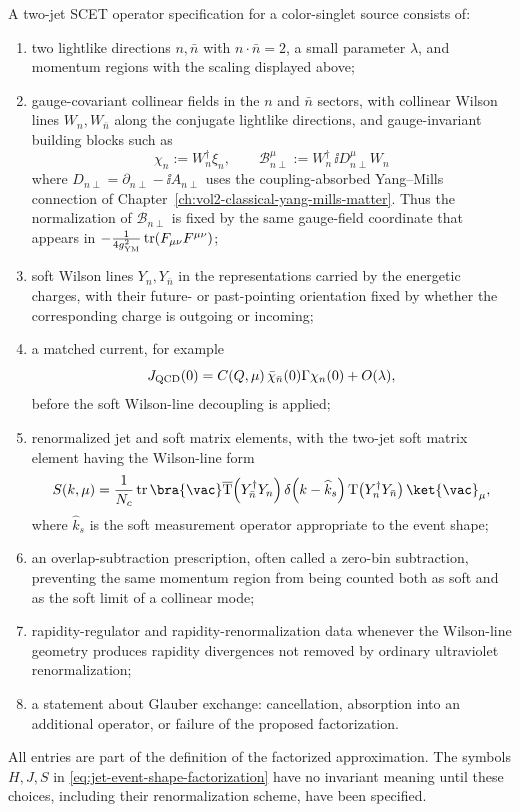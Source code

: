 \begin{definition}
\label{def:scet-two-jet-operator-datum}
A two-jet SCET operator specification for a color-singlet source consists of:
\begin{enumerate}
  \item two lightlike directions \(n,\bar n\) with \(n\cdot\bar n=2\), a small
  parameter \(\lambda\), and momentum regions with the scaling displayed
  above;
  \item gauge-covariant collinear fields in the \(n\) and \(\bar n\) sectors,
  with collinear Wilson lines \(W_n,W_{\bar n}\) along the conjugate lightlike
  directions, and gauge-invariant building blocks such as
  \[
    \chi_n:=W_n^\dagger\xi_n,\qquad
    \mathcal B_{n\perp}^{\mu}:=W_n^\dagger\,\ii D_{n\perp}^{\mu}W_n
  \]
  where \(D_{n\perp}=\partial_{n\perp}-\ii A_{n\perp}\) uses the
  coupling-absorbed Yang--Mills connection of
  Chapter~\ref{ch:vol2-classical-yang-mills-matter}.  Thus the normalization
  of \(\mathcal B_{n\perp}\) is fixed by the same gauge-field coordinate that
  appears in
  \(-\frac1{4g_{\rm YM}^2}\operatorname{tr}(F_{\mu\nu}F^{\mu\nu})\);
  \item soft Wilson lines \(Y_n,Y_{\bar n}\) in the representations carried by
  the energetic charges, with their future- or past-pointing orientation fixed
  by whether the corresponding charge is outgoing or incoming;
  \item a matched current, for example
  \[
    J_{\rm QCD}(0)
    =
    C(Q,\mu)\,
    \bar\chi_{\bar n}(0)\Gamma\chi_n(0)
    +O(\lambda),
  \]
  before the soft Wilson-line decoupling is applied;
  \item renormalized jet and soft matrix elements, with the two-jet soft
  matrix element having the Wilson-line form
  \[
    S(k,\mu)
    =
    \frac1{N_c}
    \operatorname{tr}
    \bra{\vac}
    \overline{\operatorname T}\!\left(Y_{\bar n}^\dagger Y_n\right)
    \delta\!\left(k-\widehat k_s\right)
    \operatorname T\!\left(Y_n^\dagger Y_{\bar n}\right)
    \ket{\vac}_{\mu},
  \]
  where \(\widehat k_s\) is the soft measurement operator appropriate to the
  event shape;
  \item an overlap-subtraction prescription, often called a zero-bin
  subtraction, preventing the same momentum region from being counted both as
  soft and as the soft limit of a collinear mode;
  \item rapidity-regulator and rapidity-renormalization data whenever the
  Wilson-line geometry produces rapidity divergences not removed by ordinary
  ultraviolet renormalization;
  \item a statement about Glauber exchange: cancellation, absorption into an
  additional operator, or failure of the proposed factorization.
\end{enumerate}
All entries are part of the definition of the factorized approximation.  The
symbols \(H,J,S\) in \eqref{eq:jet-event-shape-factorization} have no invariant
meaning until these choices, including their renormalization scheme, have been
specified.
\end{definition}

